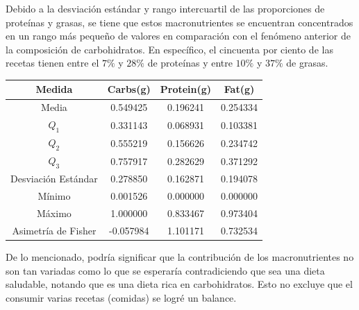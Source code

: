 \documentclass[12pt,a4paper]{article}
\begin{document}
        Debido a la desviación estándar y rango intercuartil de las proporciones 
        de proteínas y grasas, se tiene que estos macronutrientes se encuentran 
        concentrados en un rango más pequeño de valores en comparación con el 
        fenómeno anterior de la composición de carbohidratos. En específico, el 
        cincuenta por ciento de las recetas tienen entre el $7\%$ y $28\%$ de 
        proteínas y entre $10\%$ y $37\%$ de grasas.
        \begin{center}
            \begin{tabular}{|c|ccc|}
                \hline
                Medida & Carbs(g) & Protein(g) & Fat(g) \\
                \hline
                Media               & 0.549425 & 0.196241 & 0.254334  \\
                $Q_1$               & 0.331143 & 0.068931 & 0.103381  \\
                $Q_2$               & 0.555219 & 0.156626 & 0.234742  \\
                $Q_3$               & 0.757917 & 0.282629 &	0.371292  \\
                Desviación Estándar & 0.278850 & 0.162871 & 0.194078  \\
                Mínimo              & 0.001526 & 0.000000 & 0.000000  \\
                Máximo              & 1.000000 & 0.833467 & 0.973404  \\
                Asimetría de Fisher & -0.057984 & 1.101171 & 0.732534  \\
                \hline
            \end{tabular}
        \end{center}
        De lo mencionado, podría significar que la contribución de los macronutrientes 
        no son tan variadas como lo que se esperaría contradiciendo que sea una 
        dieta saludable, notando que es una dieta rica en carbohidratos. Esto no 
        excluye que el consumir varias recetas (comidas) se logré un balance.\\
\end{document}
